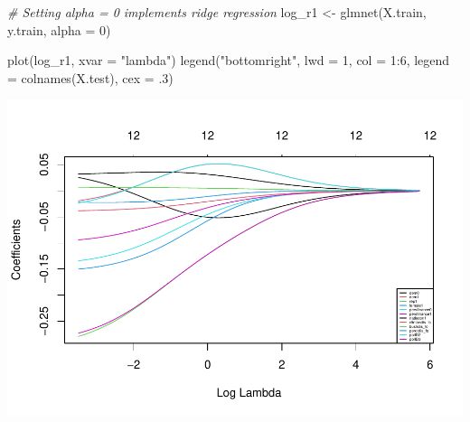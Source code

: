 \documentclass[
]{article}
\newenvironment{Shaded}{\begin{snugshade}}{\end{snugshade}}
\newcommand{\AttributeTok}[1]{\textcolor[rgb]{0.77,0.63,0.00}{#1}}
\newcommand{\CommentTok}[1]{\textcolor[rgb]{0.56,0.35,0.01}{\textit{#1}}}
\newcommand{\DecValTok}[1]{\textcolor[rgb]{0.00,0.00,0.81}{#1}}
\newcommand{\FunctionTok}[1]{\textcolor[rgb]{0.00,0.00,0.00}{#1}}
\newcommand{\NormalTok}[1]{#1}
\newcommand{\OtherTok}[1]{\textcolor[rgb]{0.56,0.35,0.01}{#1}}
\newcommand{\SpecialCharTok}[1]{\textcolor[rgb]{0.00,0.00,0.00}{#1}}
\newcommand{\StringTok}[1]{\textcolor[rgb]{0.31,0.60,0.02}{#1}}
\begin{document}
\begin{Shaded}
\begin{Highlighting}[]
\CommentTok{\# Setting alpha = 0 implements ridge regression}
\NormalTok{log\_r1 }\OtherTok{\textless{}{-}} \FunctionTok{glmnet}\NormalTok{(X.train, y.train, }\AttributeTok{alpha =} \DecValTok{0}\NormalTok{)}


\FunctionTok{plot}\NormalTok{(log\_r1, }\AttributeTok{xvar =} \StringTok{"lambda"}\NormalTok{)}
\FunctionTok{legend}\NormalTok{(}\StringTok{"bottomright"}\NormalTok{, }\AttributeTok{lwd =} \DecValTok{1}\NormalTok{, }\AttributeTok{col =} \DecValTok{1}\SpecialCharTok{:}\DecValTok{6}\NormalTok{, }\AttributeTok{legend =} \FunctionTok{colnames}\NormalTok{(X.test), }\AttributeTok{cex =}\NormalTok{ .}\DecValTok{3}\NormalTok{)}
\end{Highlighting}
\end{Shaded}

\includegraphics{1992-US-election_files/figure-latex/unnamed-chunk-12-1.pdf}

\begin{Shaded}
\end{Shaded}
\end{document}
